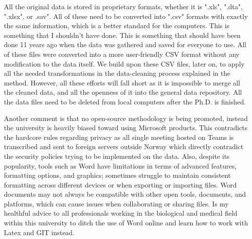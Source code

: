 All the original data is stored in proprietary formats, whether it is ".xls", ".dta", ".xlsx", or .sav". All of these need to be converted into ".csv" formats with exactly the same information, which is a better standard for the computers. This is something that I shouldn't have done. This is something that should have been done 11 years ago when the data was gathered and saved for everyone to use. All of these files were converted into a more user-friendly CSV format without any modification to the data itself. We build upon these CSV files, later on, to apply all the needed transformations in the data-cleaning process explained in the method. However, all these efforts will fall short as it is impossible to merge all the cleaned data, and all the openness of it into the general data repository. All the data files need to be deleted from local computers after the Ph.D. is finished.

Another comment is that no open-source methodology is being promoted, instead the university is heavily biased toward using Microsoft products. This contradicts the hardcore rules regarding privacy as all single meeting hosted on Teams is transcribed and sent to foreign servers outside Norway which directly contradict the security policies trying to be implemented on the data. Also, despite its popularity, tools such as Word have limitations in terms of advanced features, formatting options, and graphics; sometimes struggle to maintain consistent formatting across different devices or when exporting or importing files. Word documents may not always be compatible with other open tools, documents, and platforms, which can cause issues when collaborating or sharing files.  Is my healthful advice to all professionals working in the biological and medical field within this university to ditch the use of Word online and learn how to work with Latex and GIT instead.


